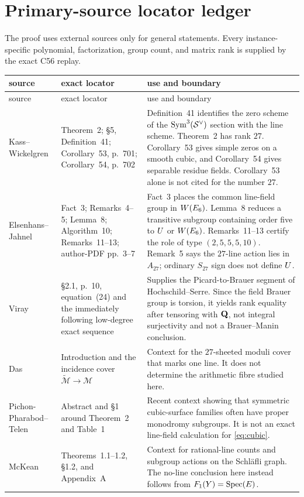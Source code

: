 \section{Primary-source locator ledger}
\label{app:source-ledger}

The proof uses external sources only for general statements.  Every
instance-specific polynomial, factorization, group count, and matrix rank is
supplied by the exact C56 replay.

\begin{longtable}{@{}>{\raggedright\arraybackslash}p{}>{\raggedright\arraybackslash}p{}>{\raggedright\arraybackslash}p{}@{}}
\toprule
source & exact locator & use and boundary\\
\midrule
\endfirsthead
\toprule
source & exact locator & use and boundary\\
\midrule
\endhead
Kass--Wickelgren
\cite{KassWickelgren2021}
& Theorem~2; \S5, Definition~41; Corollary~53, p.~701;
Corollary~54, p.~702
& Definition~41 identifies the zero scheme of the
\(\operatorname{Sym}^3(\mathcal S^\vee)\) section with the line scheme.
Theorem~2 has rank \(27\).  Corollary~53 gives simple zeros on a smooth
cubic, and Corollary~54 gives separable residue fields.  Corollary~53 alone
is not cited for the number \(27\).\\
\addlinespace
Elsenhans--Jahnel
\cite{ElsenhansJahnel2009}
& Fact~3; Remarks~4--5; Lemma~8; Algorithm~10;
Remarks~11--13; author-PDF pp.~3--7
& Fact~3 places the common line-field group in \(W(E_6)\).  Lemma~8 reduces a
transitive subgroup containing order five to \(U\) or \(W(E_6)\).
Remarks~11--13 certify the role of type \((2,5,5,5,10)\).
Remark~5 says the \(27\)-line action lies in \(A_{27}\); ordinary
\(S_{27}\) sign does not define \(U\).\\
\addlinespace
Viray \cite{Viray2023}
& \S2.1, p.~10, equation~(24) and the immediately following low-degree
exact sequence
& Supplies the Picard-to-Brauer segment of Hochschild--Serre.  Since the
field Brauer group is torsion, it yields rank equality after tensoring with
\(\mathbf Q\), not integral surjectivity and not a Brauer--Manin conclusion.\\
\addlinespace
Das \cite{Das2021}
& Introduction and the incidence cover
\(\widetilde{\mathcal M}\to\mathcal M\)
& Context for the \(27\)-sheeted moduli cover that marks one line.  It does
not determine the arithmetic fibre studied here.\\
\addlinespace
Pichon-Pharabod--Telen
\cite{PichonPharabodTelen2025}
& Abstract and \S1 around Theorem~2 and Table~1
& Recent context showing that symmetric cubic-surface families often have
proper monodromy subgroups.  It is not an exact line-field calculation for
\cref{eq:cubic}.\\
\addlinespace
McKean \cite{McKean2021}
& Theorems~1.1--1.2, \S1.2, and Appendix~A
& Context for rational-line counts and subgroup actions on the Schläfli
graph.  The no-line conclusion here instead follows from
\(F_1(Y)=\operatorname{Spec}(E)\).\\
\bottomrule
\end{longtable}

